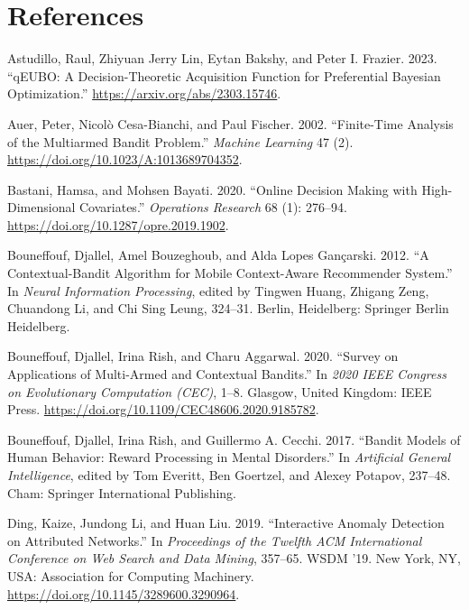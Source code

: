 \documentclass[
  letterpaper,
  DIV=11,
  numbers=noendperiod,
  oneside]{scrreprt}
\newlength{\cslhangindent}
\newenvironment{CSLReferences}[2] %
 {\begin{list}{}{%
  \setlength{\itemindent}{0pt}
  \setlength{\leftmargin}{0pt}
  \setlength{\parsep}{0pt}
  \ifodd #1
   \setlength{\leftmargin}{\cslhangindent}
   \setlength{\itemindent}{-1\cslhangindent}
  \fi
  \setlength{\itemsep}{#2\baselineskip}}}
 {\end{list}}
\theoremstyle{remark}
\begin{document}
\section*{References}\label{bibliography-4}


\label{refs-4}
\begin{CSLReferences}{1}{0}
Astudillo, Raul, Zhiyuan Jerry Lin, Eytan Bakshy, and Peter I. Frazier.
2023. {``qEUBO: A Decision-Theoretic Acquisition Function for
Preferential Bayesian Optimization.''}
\url{https://arxiv.org/abs/2303.15746}.

Auer, Peter, Nicolò Cesa-Bianchi, and Paul Fischer. 2002. {``Finite-Time
Analysis of the Multiarmed Bandit Problem.''} \emph{Machine Learning} 47
(2). \url{https://doi.org/10.1023/A:1013689704352}.

Bastani, Hamsa, and Mohsen Bayati. 2020. {``Online Decision Making with
High-Dimensional Covariates.''} \emph{Operations Research} 68 (1):
276--94. \url{https://doi.org/10.1287/opre.2019.1902}.

Bouneffouf, Djallel, Amel Bouzeghoub, and Alda Lopes Gançarski. 2012.
{``A Contextual-Bandit Algorithm for Mobile Context-Aware Recommender
System.''} In \emph{Neural Information Processing}, edited by Tingwen
Huang, Zhigang Zeng, Chuandong Li, and Chi Sing Leung, 324--31. Berlin,
Heidelberg: Springer Berlin Heidelberg.

Bouneffouf, Djallel, Irina Rish, and Charu Aggarwal. 2020. {``Survey on
Applications of Multi-Armed and Contextual Bandits.''} In \emph{2020
IEEE Congress on Evolutionary Computation (CEC)}, 1--8. Glasgow, United
Kingdom: IEEE Press.
\url{https://doi.org/10.1109/CEC48606.2020.9185782}.

Bouneffouf, Djallel, Irina Rish, and Guillermo A. Cecchi. 2017.
{``Bandit Models of Human Behavior: Reward Processing in Mental
Disorders.''} In \emph{Artificial General Intelligence}, edited by Tom
Everitt, Ben Goertzel, and Alexey Potapov, 237--48. Cham: Springer
International Publishing.

Ding, Kaize, Jundong Li, and Huan Liu. 2019. {``Interactive Anomaly
Detection on Attributed Networks.''} In \emph{Proceedings of the Twelfth
ACM International Conference on Web Search and Data Mining}, 357--65.
WSDM '19. New York, NY, USA: Association for Computing Machinery.
\url{https://doi.org/10.1145/3289600.3290964}.


\end{CSLReferences}
\end{document}
